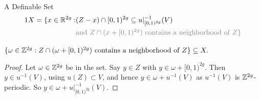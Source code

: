 \documentclass{beamer}
\begin{document}
\begin{frame}{A Definable Set} 
  \begin{alignat*}1  
    X =  \{x \in\IR^{2g} : & (Z-x)\cap [0,1)^{2g} \subset u|_{[0,1)^{2g}}^{-1}(V)\\
    &\color{gray}{\text{and } Z\cap(x+[0,1)^{2g})\text{ contains a
        neighborhood of $Z$}}
    \}
  \end{alignat*}
  
  \begin{lemma}
    $\{\omega\in{\mathbb{Z}}^{2g} :    Z\cap (\omega+[0,1)^{2g})\text{
      contains a neighborhood  of $Z$}\} \subseteq X.$
  \end{lemma}
  \begin{proof}
    Let $\omega \in{\mathbb{Z}}^{2g}$ be in the set. 
    Say $y\in Z$ with $y\in \omega+[0,1)^{2g}$. Then $y\in
    u^{-1}(V)$, using $u(Z)\subset V$, and hence $y \in \omega+u^{-1}(V)$
    as $u^{-1}(V)$ is ${\mathbb{Z}}^{2g}$-periodic. So $y \in
    \omega+u|_{[0,1)^{2g}}^{-1}(V)$.
  \end{proof}  
\end{frame}
\end{document}
